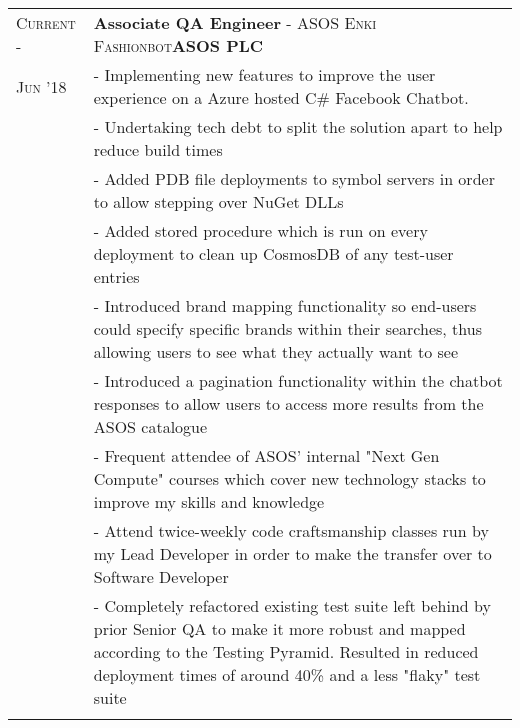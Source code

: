 \documentclass[a4paper,10pt]{extarticle} %
\begin{document}
{\begin{tabularx}{\linewidth}{ l | X }


\textsc{Current -} & \textbf{Associate QA Engineer} \textsc{ - ASOS Enki Fashionbot}\hfill\textbf{ASOS PLC}\\
\textsc{Jun '18}& {- Implementing new features to improve the user experience on a Azure hosted C\# Facebook Chatbot. }\\
& {- Undertaking tech debt to split the solution apart to help reduce build times}\\
& {- Added PDB file deployments to symbol servers in order to allow stepping over NuGet DLLs}\\
& {- Added stored procedure which is run on every deployment to clean up CosmosDB of any test-user entries}\\
& {- Introduced brand mapping functionality so end-users could specify specific brands within their searches, thus allowing users to see what they actually want to see}\\
& {- Introduced a pagination functionality within the chatbot responses to allow users to access more results from the ASOS catalogue}\\
& {- Frequent attendee of ASOS' internal "Next Gen Compute" courses which cover new technology stacks to improve my skills and knowledge}\\
& {- Attend twice-weekly code craftsmanship classes run by my Lead Developer in order to make the transfer over to Software Developer}\\
& {- Completely refactored existing test suite left behind by prior Senior QA to make it more robust and mapped according to the Testing Pyramid. Resulted in reduced deployment times of around 40\% and a less "flaky" test suite}\\
\multicolumn{1}{c}{} \\




\end{tabularx}}
\end{document}
